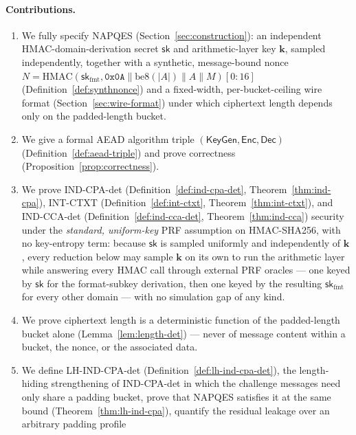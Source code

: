 \documentclass[11pt,a4paper]{article}
\begin{document}
\paragraph{Contributions.}
\begin{enumerate}
  \item We fully specify NAPQES (Section~\ref{sec:construction}): an
        independent HMAC-domain-derivation secret $\mathsf{sk}$ and
        arithmetic-layer key $\mathbf{k}$, sampled independently, together
        with a synthetic, message-bound nonce
        $N=\mathrm{HMAC}(\mathsf{sk}_{\mathrm{fmt}},\texttt{0x0A}\|\mathrm{be8}(|A|)\|A\|M)[0{:}16]$
        (Definition~\ref{def:synthnonce}) and a fixed-width, per-bucket-ceiling
        wire format (Section~\ref{sec:wire-format}) under which ciphertext
        length depends only on the padded-length bucket.
  \item We give a formal AEAD algorithm triple
        $(\mathsf{KeyGen},\mathsf{Enc},\mathsf{Dec})$
        (Definition~\ref{def:aead-triple}) and prove correctness
        (Proposition~\ref{prop:correctness}).
  \item We prove IND-CPA-det (Definition~\ref{def:ind-cpa-det},
        Theorem~\ref{thm:ind-cpa}), INT-CTXT
        (Definition~\ref{def:int-ctxt}, Theorem~\ref{thm:int-ctxt}), and
        IND-CCA-det (Definition~\ref{def:ind-cca-det},
        Theorem~\ref{thm:ind-cca}) security under the \emph{standard,
        uniform-key}
        PRF assumption on HMAC-SHA256, with no key-entropy term: because
        $\mathsf{sk}$ is sampled uniformly and independently of
        $\mathbf{k}$, every reduction below may sample $\mathbf{k}$ on its
        own to run the arithmetic layer while answering every HMAC call
        through external PRF oracles — one keyed by $\mathsf{sk}$ for the
        format-subkey derivation, then one keyed by the resulting
        $\mathsf{sk}_{\mathrm{fmt}}$ for every other domain — with no
        simulation gap of any kind.
  \item We prove ciphertext length is a deterministic function of the
        padded-length bucket alone (Lemma~\ref{lem:length-det}) — never of
        message content within a bucket, the nonce, or the associated data.
  \item We define LH-IND-CPA-det (Definition~\ref{def:lh-ind-cpa-det}), the
        length-hiding strengthening of IND-CPA-det in which the challenge
        messages need only share a padding bucket, prove that NAPQES
        satisfies it at the same bound (Theorem~\ref{thm:lh-ind-cpa}),
        quantify the residual leakage over an arbitrary padding profile

\end{enumerate}
\end{document}
